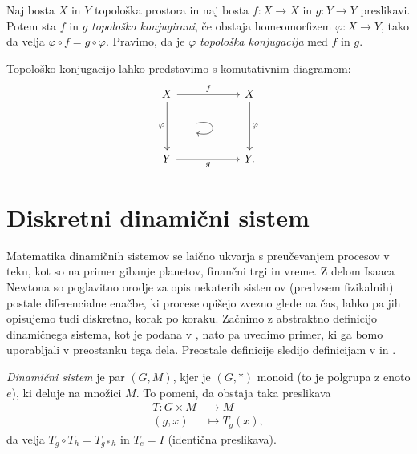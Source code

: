 \documentclass{isrmdelo}
\begin{document}
\begin{definicija}
Naj bosta $X$ in $Y$ topološka prostora in naj bosta $f: X \rightarrow X$ in $g: Y \rightarrow Y$ preslikavi. Potem sta $f$ in $g$ \emph{topološko konjugirani}, če obstaja homeomorfizem $\varphi: X \rightarrow Y$, tako da velja $\varphi \circ f = g \circ \varphi$. Pravimo, da je $\varphi$ \emph{topološka konjugacija} med $f$ in $g$.
\end{definicija}

Topološko konjugacijo lahko predstavimo s komutativnim diagramom:
\begin{equation*}
\begin{tikzcd}
X \arrow{rr}{f} \arrow[swap]{dd}{\varphi} & & X \arrow{dd}{\varphi} \\
& \arrow[loop right, distance=2em, start anchor={[xshift=-1.5em]east}, end anchor={[xshift=-1.5em, yshift=-2ex]east}] & \\
Y \arrow[swap]{rr}{g} & & Y.
\end{tikzcd}
\end{equation*}

\section{Diskretni dinamični sistem}

Matematika dinamičnih sistemov se laično ukvarja s preučevanjem procesov v teku, kot so na primer gibanje planetov, finančni trgi in vreme. Z delom Isaaca Newtona so poglavitno orodje za opis nekaterih sistemov (predvsem fizikalnih) postale diferencialne enačbe, ki procese opišejo zvezno glede na čas, lahko pa jih opisujemo tudi diskretno, korak po koraku. Začnimo z abstraktno definicijo dinamičnega sistema, kot je podana v \cite{teschl12}, nato pa uvedimo primer, ki ga bomo uporabljali v preostanku tega dela. Preostale definicije sledijo definicijam v \cite{holmgren96} in \cite{teschl12}.

\begin{definicija}
\emph{Dinamični sistem} je par $(G, M)$, kjer je $(G, *)$ monoid (to je polgrupa z enoto $e$), ki deluje na množici $M$. To pomeni, da obstaja taka preslikava
\begin{align*}
T\colon G \times M & \longrightarrow M \\
(g, x) & \longmapsto T_g(x),
\end{align*}
da velja $T_g \circ T_h = T_{g * h}$ in $T_e = I$ (identična preslikava).
\end{definicija}
\end{document}
